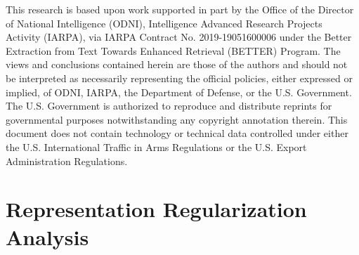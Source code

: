 \documentclass[11pt,a4paper]{article}
\begin{document}
This research is based upon work supported in part by the Office of the Director of National Intelligence (ODNI), Intelligence Advanced Research Projects Activity (IARPA), via IARPA Contract No. 2019-19051600006 under the Better Extraction from Text Towards Enhanced Retrieval (BETTER) Program. The views and conclusions contained herein are those of the authors and should not be interpreted as necessarily representing the official policies, either expressed or implied, of ODNI, IARPA, the Department of Defense, or the U.S. Government. The U.S. Government is authorized to reproduce and distribute reprints for governmental purposes notwithstanding any copyright annotation therein. This document does not contain technology or technical data controlled under either the U.S. International Traffic in Arms Regulations or the U.S. Export Administration Regulations.




\clearpage

\appendix

\iffalse
\section{Representation Regularization Analysis}
\label{app:rr}



\begin{table}[t!]
\begin{center}
\end{center}
\caption{\label{tab:reg-Analysis} \small The performance (i.e., F1 scores) of ONG and ONG\_REG\_wMP-GCN on the four data folds of the development sets for 14res, 14lap, 15res, and 16res. The data folds are based on the target-opinion distances of the examples (called Distance in this table).}
\end{table}
\end{document}
